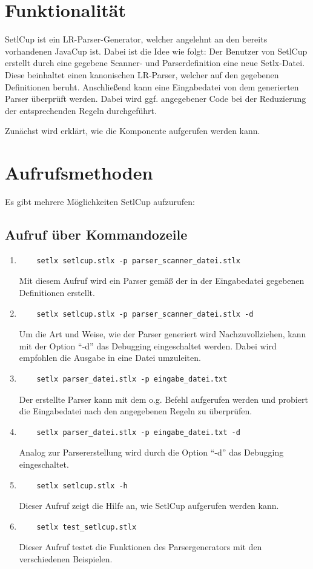 \section{Funktionalität}
SetlCup ist ein LR-Parser-Generator, welcher angelehnt an den bereits vorhandenen JavaCup ist.
Dabei ist die Idee wie folgt:
Der Benutzer von SetlCup erstellt durch eine gegebene Scanner- und Parserdefinition eine neue Setlx-Datei. Diese beinhaltet einen kanonischen LR-Parser, welcher auf den gegebenen Definitionen beruht. Anschließend kann eine Eingabedatei von dem generierten Parser überprüft werden. Dabei wird ggf. angegebener Code bei der Reduzierung der entsprechenden Regeln durchgeführt. 

Zunächst wird erklärt, wie die Komponente aufgerufen werden kann.
\section{Aufrufsmethoden}
Es gibt mehrere Möglichkeiten SetlCup aufzurufen:
\subsection{Aufruf über Kommandozeile}
\begin{enumerate}
	\item \begin{Verbatim}
	setlx setlcup.stlx -p parser_scanner_datei.stlx
	\end{Verbatim}
			Mit diesem Aufruf wird ein Parser gemäß der in der Eingabedatei gegebenen Definitionen erstellt.
	\item \begin{Verbatim}
	setlx setlcup.stlx -p parser_scanner_datei.stlx -d
	\end{Verbatim}
			Um die Art und Weise, wie der Parser generiert wird Nachzuvollziehen, kann mit der Option "`-d"' das Debugging eingeschaltet werden. Dabei wird empfohlen die Ausgabe in eine Datei umzuleiten.
	\item \begin{Verbatim}
	setlx parser_datei.stlx -p eingabe_datei.txt
	\end{Verbatim}
	Der erstellte Parser kann mit dem o.g. Befehl aufgerufen werden und probiert die Eingabedatei nach den angegebenen Regeln zu überprüfen.
		\item \begin{Verbatim}
	setlx parser_datei.stlx -p eingabe_datei.txt -d
	\end{Verbatim}
	Analog zur Parsererstellung wird durch die Option "`-d"' das Debugging eingeschaltet.
	\item \begin{Verbatim}
	setlx setlcup.stlx -h
	\end{Verbatim}
			Dieser Aufruf zeigt die Hilfe an, wie SetlCup aufgerufen werden kann.
	\item \begin{Verbatim}
	setlx test_setlcup.stlx
	\end{Verbatim}
			Dieser Aufruf testet die Funktionen des Parsergenerators mit den verschiedenen Beispielen.
\end{enumerate}
